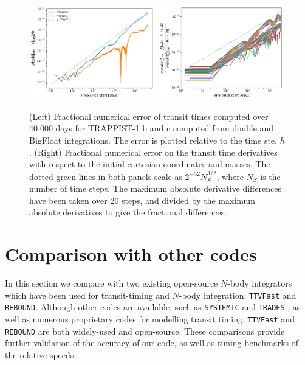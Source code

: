 \documentclass[fleqn,usenatbib,twocolumn]{mnras}
\begin{document}
\begin{figure}
    \centering
    \includegraphics[width=0.49\textwidth]{transit_time_errors_4e4.pdf}
        \includegraphics[width=0.49\textwidth]{Timing_derivative_errors_4e4days_maxabs20.pdf}
    \caption{(Left) Fractional numerical error of transit times computed over 40,000 days for TRAPPIST-1 b and c computed from double and BigFloat integrations.  The error is plotted relative to the time ste, $h$.  (Right) Fractional numerical error on the transit time derivatives with respect to the initial cartesian coordinates and masses.  The dotted green lines in both panels scale as $2^{-52} N_S^{3/2}$, where $N_S$ is the number of time steps.  The maximum absolute derivative differences have been taken over 20 steps, and divided by the maximum absolute derivatives to give the fractional differences.
    }
    \label{fig:timing_precision}
\end{figure}

\section{Comparison with other codes} \label{sec:comparison}

In this section we compare with two existing open-source $N$-body integrators which
have been used for transit-timing and $N$-body integration:  \texttt{TTVFast} and \texttt{REBOUND}.  Although other codes
are available, such as \texttt{SYSTEMIC} \citep{Meschiari2010} and
\texttt{TRADES} \citep{Borsato2014}, as well as numerous proprietary
codes for modelling transit timing, \texttt{TTVFast} and \texttt{REBOUND} are both widely-used and open-source. These comparisons provide further validation of the accuracy of our code, as well as timing benchmarks of the relative speeds.
\end{document}
